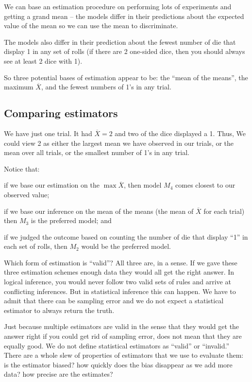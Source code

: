 \documentclass[11pt]{article}
\begin{document}
We can base an estimation procedure on performing lots of experiments and getting a grand mean -- the models differ in their predictions about the expected value of the mean so we can use the mean to discriminate.

The models also differ in their prediction about the fewest number of die that display 1 in any set of rolls (if there are 2 one-sided dice, then you should always see at least 2 dice with 1).

So three potential bases of estimation appear to be: the ``mean of the means'', the maximum $\overline{X}$, and the fewest numbers of 1's in any trial.

\subsection*{Comparing estimators}
We have just one trial. It had $\overline{X} = 2$ and two of the dice displayed a 1.
Thus, We could view 2 as either the largest mean we have observed in our trials, or the mean over all trials, or the smallest number of 1's in any trial.

Notice that:
\begin{compactitem}
	\item  if we base our estimation on the $\max \overline{X}$, then model $M_4$ comes closest to our observed value;
	\item if we base our inference on the mean of the means (the mean of $\overline{X}$ for each trial) then $M_3$ is the preferred model; and 
	\item if we judged the outcome based on counting the number of die that display ``1'' in each set of rolls, then $M_2$ would be the preferred model.
\end{compactitem}

Which form of estimation is ``valid''?  All three are, in a sense. If we gave these three estimation schemes enough data they would all get the right answer.  In logical inference, you would never follow two valid sets of rules and arrive at conflicting inferences.  But in statistical inference this can happen.  We have to admit that there can be sampling error and we do not expect a statistical estimator to always return the truth.

Just because multiple estimators are valid in the sense that they would get the answer right if you could get rid of sampling error, does not mean that they are equally good. We do not define statistical estimators as ``valid'' or ``invalid.''  There are a whole slew of properties of estimators that we use to evaluate them: is the estimator biased? how quickly does the bias disappear as we add more data? how precise are the estimates?
\end{document}

